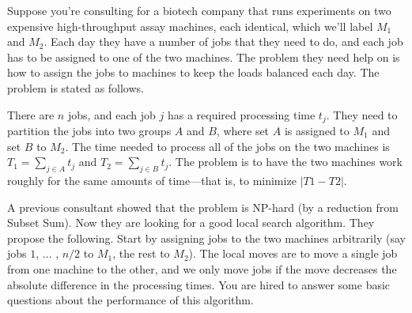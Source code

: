 \begin{exercise}[]{Suppose you’re consulting for a biotech company that runs experiments on two expensive high-throughput assay machines, each identical, which we’ll label $M_1$ and $M_2$. Each day they have a number of jobs that they need to do, and each job has to be assigned to one of the two machines. The problem they need help on is how to assign the jobs to machines to keep the loads balanced each day. The problem is stated as follows. 

    There are $n$ jobs, and each job $j$ has a required processing time $t_j$. They need to partition the jobs into two groups $A$ and $B$, where set $A$ is assigned to $M_1$ and set $B$ to $M_2$. The time needed to process all of the jobs on the two machines is $T_1 = \sum_{j \in A} t_j$ and $T_2 = \sum_{j \in B} t_j$. The problem is to have the two machines work roughly for the same amounts of time—that is, to minimize $\left | T1 - T2 \right |$.
    
    A previous consultant showed that the problem is NP-hard (by a reduction from Subset Sum). Now they are looking for a good local search algorithm. They propose the following. Start by assigning jobs to the two machines arbitrarily (say jobs $1$, ... , $n/2$ to $M_1$, the rest to $M_2$). The local moves are to move a single job from one machine to the other, and we only move jobs if the move decreases the absolute difference in the processing times. You are hired to answer some basic questions about the performance of this algorithm.
    
}
\end{exercise}
